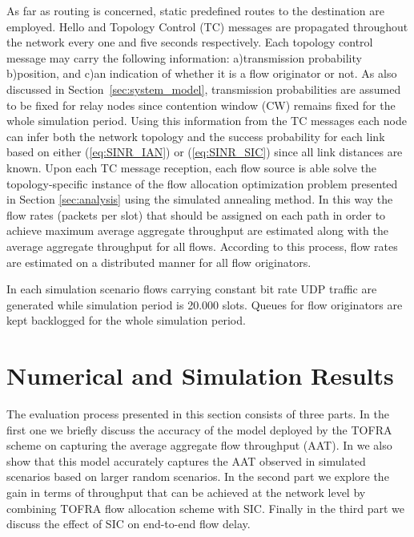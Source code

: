 \documentclass[conference]{IEEEtran}
\begin{document}
As far as routing is concerned, static predefined routes to the destination are employed.
Hello and Topology Control (TC) messages are propagated throughout the network every one and five seconds respectively.
Each topology control message may carry the following information: a)transmission probability b)position, and
c)an indication of whether it is a flow originator or not.
As also discussed in Section~\ref{sec:system_model}, transmission probabilities are assumed to be fixed for relay nodes since contention
window (CW) remains fixed for the whole simulation period.
Using this information from the TC messages each node can infer both the network topology and the success probability for each link
based on either (\ref{eq:SINR_IAN}) or (\ref{eq:SINR_SIC}) since all link distances are known.
Upon each TC message reception, each flow source is able solve the topology-specific instance of the flow allocation optimization problem
presented in Section \ref{sec:analysis}
using the simulated annealing method. In this way the flow rates (packets per slot) that should be assigned on each path
in order to achieve maximum average aggregate throughput are estimated along with the average aggregate throughput for all flows.
According to this process, flow rates are estimated on a distributed manner for all flow originators.

In each simulation scenario flows carrying constant bit rate UDP traffic are generated while simulation period is 20.000 slots.
Queues for flow originators are kept backlogged for the whole simulation period.

\section{Numerical and Simulation Results}
\label{sec:results}

The evaluation process presented in this section consists of three parts. In the first one we briefly discuss the accuracy of the model deployed
by the TOFRA scheme on capturing the average aggregate flow throughput (AAT).
In \cite{DBLP:journals/corr/PloumidisPT14} we also show that this model accurately captures the AAT observed in
simulated scenarios based on larger random scenarios.
In the second part we explore the gain in terms of throughput that can be achieved at the network level by combining TOFRA
flow allocation scheme with SIC.
Finally in the third part we discuss the effect of SIC on end-to-end flow delay.
\end{document}
